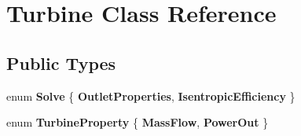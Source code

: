 \hypertarget{class_turbine}{}\section{Turbine Class Reference}
\label{class_turbine}
\subsection*{Public Types}
\begin{DoxyCompactItemize}
\item 
\mbox{\label{class_turbine_a9fd7beba6c6f071e228fbe3e07969d2b}} 
enum {\bfseries Solve} \{ {\bfseries Outlet\+Properties}, 
{\bfseries Isentropic\+Efficiency}
 \}
\item 
\mbox{\label{class_turbine_a5db4f65cf2539e3837684d53221ade12}} 
enum {\bfseries Turbine\+Property} \{ {\bfseries Mass\+Flow}, 
{\bfseries Power\+Out}
 \}
\end{DoxyCompactItemize}
